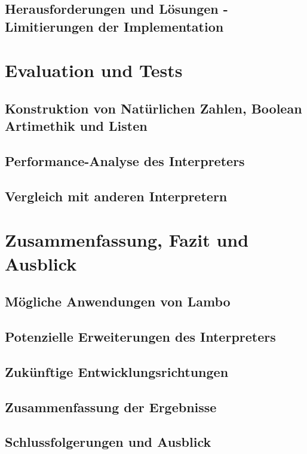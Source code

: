 \documentclass[ngerman]{article}
\begin{document}
\subsection{Herausforderungen und Lösungen - Limitierungen der Implementation}


\section{Evaluation und Tests}

\subsection{Konstruktion von Natürlichen Zahlen, Boolean Artimethik und Listen}

\subsection{Performance-Analyse des Interpreters}

\subsection{Vergleich mit anderen Interpretern}


\section{Zusammenfassung, Fazit und Ausblick}

\subsection{Mögliche Anwendungen von Lambo}

\subsection{Potenzielle Erweiterungen des Interpreters}

\subsection{Zukünftige Entwicklungsrichtungen}

\subsection{Zusammenfassung der Ergebnisse}

\subsection{Schlussfolgerungen und Ausblick}

\end{document}
